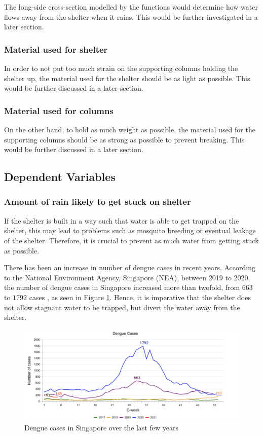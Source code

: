 \documentclass[a4paper,titlepage]{article}
\begin{document}
The long-side cross-section modelled by the functions would determine how water flows away from the shelter when it rains. This would be further investigated in a later section.

\subsubsection{Material used for shelter}

In order to not put too much strain on the supporting columns holding the shelter up, the material used for the shelter should be as light as possible. This would be further discussed in a later section.

\subsubsection{Material used for columns}

On the other hand, to hold as much weight as possible, the material used for the supporting columns should be as strong as possible to prevent breaking. This would be further discussed in a later section.

\subsection{Dependent Variables}\label{sec:Variables:Dependent Variables}

\subsubsection{Amount of rain likely to get stuck on shelter}

If the shelter is built in a way such that water is able to get trapped on the shelter, this may lead to problems such as mosquito breeding or eventual leakage of the shelter. Therefore, it is crucial to prevent as much water from getting stuck as possible.

There has been an increase in number of dengue cases in recent years. According to the National Environment Agency, Singapore (NEA), between 2019 to 2020, the number of dengue cases in Singapore increased more than twofold, from $663$ to $1792$ cases \cite{nea-dengue}, as seen in Figure \ref{fig:dengueCases}. Hence, it is imperative that the shelter does not allow stagnant water to be trapped, but divert the water away from the shelter.

\begin{figure}[htbp]
    \centering
    \includegraphics[width=\textwidth]{dengueCases.png}
    \caption{Dengue cases in Singapore over the last few years}
    \label{fig:dengueCases}
\end{figure}
\end{document}
